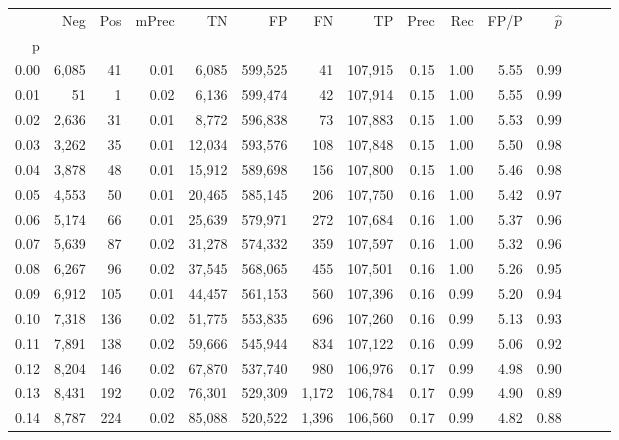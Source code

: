 \begin{tabular}{rrrrrrrrrrrrrrr}
\toprule
{} &     Neg &    Pos & mPrec &       TN &       FP &       FN &       TP &  Prec &   Rec &  FP/P & $\hat{p}$ \\
p    &         &        &       &          &          &          &          &       &       &       &           \\
\midrule
0.00 &   6,085 &     41 &  0.01 &    6,085 &  599,525 &       41 &  107,915 &  0.15 &  1.00 &  5.55 &      0.99 \\
0.01 &      51 &      1 &  0.02 &    6,136 &  599,474 &       42 &  107,914 &  0.15 &  1.00 &  5.55 &      0.99 \\
0.02 &   2,636 &     31 &  0.01 &    8,772 &  596,838 &       73 &  107,883 &  0.15 &  1.00 &  5.53 &      0.99 \\
0.03 &   3,262 &     35 &  0.01 &   12,034 &  593,576 &      108 &  107,848 &  0.15 &  1.00 &  5.50 &      0.98 \\
0.04 &   3,878 &     48 &  0.01 &   15,912 &  589,698 &      156 &  107,800 &  0.15 &  1.00 &  5.46 &      0.98 \\
0.05 &   4,553 &     50 &  0.01 &   20,465 &  585,145 &      206 &  107,750 &  0.16 &  1.00 &  5.42 &      0.97 \\
0.06 &   5,174 &     66 &  0.01 &   25,639 &  579,971 &      272 &  107,684 &  0.16 &  1.00 &  5.37 &      0.96 \\
0.07 &   5,639 &     87 &  0.02 &   31,278 &  574,332 &      359 &  107,597 &  0.16 &  1.00 &  5.32 &      0.96 \\
0.08 &   6,267 &     96 &  0.02 &   37,545 &  568,065 &      455 &  107,501 &  0.16 &  1.00 &  5.26 &      0.95 \\
0.09 &   6,912 &    105 &  0.01 &   44,457 &  561,153 &      560 &  107,396 &  0.16 &  0.99 &  5.20 &      0.94 \\
0.10 &   7,318 &    136 &  0.02 &   51,775 &  553,835 &      696 &  107,260 &  0.16 &  0.99 &  5.13 &      0.93 \\
0.11 &   7,891 &    138 &  0.02 &   59,666 &  545,944 &      834 &  107,122 &  0.16 &  0.99 &  5.06 &      0.92 \\
0.12 &   8,204 &    146 &  0.02 &   67,870 &  537,740 &      980 &  106,976 &  0.17 &  0.99 &  4.98 &      0.90 \\
0.13 &   8,431 &    192 &  0.02 &   76,301 &  529,309 &    1,172 &  106,784 &  0.17 &  0.99 &  4.90 &      0.89 \\
0.14 &   8,787 &    224 &  0.02 &   85,088 &  520,522 &    1,396 &  106,560 &  0.17 &  0.99 &  4.82 &      0.88 \\

\end{tabular}

